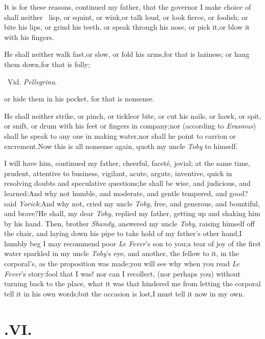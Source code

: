 \documentclass{article}
\begin{document}
It is for these reasons, continued my father, that the governor
I make choice of shall neither \fnast\ lisp, or squint, or
wink,\break or talk loud, or look fierce, or foolish;\break\tsh
or bite his lips, or grind his teeth, or speak through his nose,
or pick it,\break or blow it with his fingers.\tsh

He shall neither walk fast,\tsk or slow, or fold his
arms,\tsk for that is laziness; \tsk\break or hang them
down,\tsk for that is folly;\break
\centerline{\footnotesize \fnast\ Vid. \textit{Pellegrina}.}
\eject
\noindent
or hide them in his pocket, for that is nonsense.\tsh

He shall neither strike, or pinch, or tickle\tsk or bite, or
cut his nails, or hawk, or spit, or snift, or drum with his feet or
fingers in company;\tsh nor (according to \textit{Erasmus})
shall he speak to any one in making water,\tsk nor shall he point to
carrion or excrement.\tsh Now this is all nonsense again,
quoth my uncle \textit{Toby} to himself.\tsh

I will have him, continued my father, cheerful, faceté,
jovial; at the same time, prudent, attentive to business, vigilant,
acute, argute, inventive, quick in resolving doubts and speculative
questions;\tsh he shall be wise, and judicious, and
learned:\tsh And why not humble, and moderate, and
gentle tempered, and good? said \textit{Yorick}:\tsh And why
not, cried my uncle \textit{Toby}, free, and generous, and bountiful,
and brave?\tsh He shall, my dear \textit{Toby}, replied my
father, getting up and shaking him by his hand.\tsk\break
Then, brother
\textit{Shandy}, answered my uncle \textit{Toby}, raising himself off
the chair, and laying down his pipe to take hold of my
father’s other hand,\tsk I humbly beg I may recommend poor
\textit{Le Fever}’s son to you;\tsh a tear of joy of
the first water sparkled in my uncle \textit{Toby}’s eye,\tsk
and\break
another, the fellow to it, in the corporal’s, as the
proposition was made;\tsh you will see why when you read \textit{Le
Fe\-ver}’s story:\tsh fool that I was! nor can I
recollect, (nor perhaps you) without turning back to the place, what
it was that hindered me from letting the corporal tell it in his
own words;\tsk but the occasion is lost,\tsk I must tell it now
in my own.

\section{.\enspace VI.}
\end{document}
